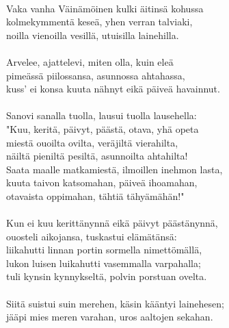                                                             \\
Vaka vanha Väinämöinen kulki äitinsä kohussa                \\
kolmekymmentä keseä, yhen verran talviaki,                  \\
noilla vienoilla vesillä, utuisilla lainehilla.             \\
                                                            \\
Arvelee, ajattelevi, miten olla, kuin eleä                  \\
pimeässä piilossansa, asunnossa ahtahassa,                  \\
kuss' ei konsa kuuta nähnyt eikä päiveä havainnut.          \\
                                                            \\
Sanovi sanalla tuolla, lausui tuolla lausehella:            \\
"Kuu, keritä, päivyt, päästä, otava, yhä opeta              \\
miestä ouoilta ovilta, veräjiltä vierahilta,                \\
näiltä pieniltä pesiltä, asunnoilta ahtahilta!              \\
Saata maalle matkamiestä, ilmoillen inehmon lasta,          \\
kuuta taivon katsomahan, päiveä ihoamahan,                  \\
otavaista oppimahan, tähtiä tähyämähän!"                    \\
                                                            \\
Kun ei kuu kerittänynnä eikä päivyt päästänynnä,            \\
ouosteli aikojansa, tuskastui elämätänsä:                   \\
liikahutti linnan portin sormella nimettömällä,             \\
lukon luisen luikahutti vasemmalla varpahalla;              \\
tuli kynsin kynnykseltä, polvin porstuan ovelta.            \\
                                                            \\
Siitä suistui suin merehen, käsin kääntyi lainehesen;       \\
jääpi mies meren varahan, uros aaltojen sekahan.            \\
                                                            \\
